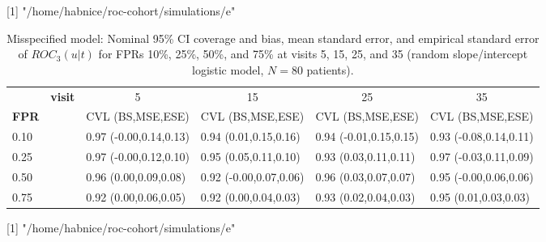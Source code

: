 [1] "/home/habnice/roc-cohort/simulations/e"
\begin{table}[ht]
\centering
\begin{tabular}{p{.4cm}p{.4cm}p{}p{}p{}p{}}
  \hline
  &\textbf{visit}& \multicolumn{1}{c}{5}&  \multicolumn{1}{c}{15} &  \multicolumn{1}{c}{25} &  \multicolumn{1}{c}{35}\\
  \textbf{FPR} & & CVL (BS,MSE,ESE) & CVL (BS,MSE,ESE) &CVL (BS,MSE,ESE) & CVL (BS,MSE,ESE)\\
 \hline
0.10 &  & 0.97 (-0.00,0.14,0.13) & 0.94 (0.01,0.15,0.16) & 0.94 (-0.01,0.15,0.15) & 0.93 (-0.08,0.14,0.11) \\ 
  0.25 &  & 0.97 (-0.00,0.12,0.10) & 0.95 (0.05,0.11,0.10) & 0.93 (0.03,0.11,0.11) & 0.97 (-0.03,0.11,0.09) \\ 
  0.50 &  & 0.96 (0.00,0.09,0.08) & 0.92 (-0.00,0.07,0.06) & 0.96 (0.03,0.07,0.07) & 0.95 (-0.00,0.06,0.06) \\ 
  0.75 &  & 0.92 (0.00,0.06,0.05) & 0.92 (0.00,0.04,0.03) & 0.93 (0.02,0.04,0.03) & 0.95 (0.01,0.03,0.03) \\ 
   \hline
\end{tabular}
\caption{Misspecified model: Nominal 95\% CI coverage and bias, mean standard error, and empirical standard error of $ROC_3(u|t)$ for FPRs 10\%, 25\%, 50\%, and 75\% at visits 5, 15, 25, and 35 (random slope/intercept logistic model, $N=80$ patients).} 
\label{tab:2}
\end{table}
[1] "/home/habnice/roc-cohort/simulations/e"
